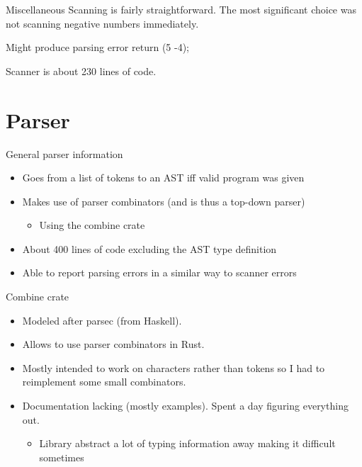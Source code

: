 \documentclass[10pt]{beamer}
\begin{document}
\begin{frame}{Miscellaneous}
    Scanning is fairly straightforward. The most significant choice was not scanning negative numbers immediately.
    \begin{block}{Might produce parsing error}
    return (5 -4);
    \end{block}
    Scanner is about 230 lines of code.
\end{frame}

\section{Parser}
\begin{frame}{General parser information}
    \begin{itemize}
        \item Goes from a list of tokens to an AST iff valid program was given
        \item Makes use of parser combinators (and is thus a top-down parser)
            \begin{itemize}
                \item Using the combine crate
            \end{itemize}
        \item About 400 lines of code excluding the AST type definition
        \item Able to report parsing errors in a similar way to scanner errors
    \end{itemize}
\end{frame}

\begin{frame}{Combine crate}
    \begin{itemize}
        \item Modeled after parsec (from Haskell).
        \item Allows to use parser combinators in Rust.
        \item Mostly intended to work on characters rather than tokens so I had to reimplement some small combinators.
        \item Documentation lacking (mostly examples). Spent a day figuring everything out.
        \begin{itemize}
            \item Library abstract a lot of typing information away making it difficult sometimes
        \end{itemize}
    \end{itemize}
\end{frame}
\end{document}
